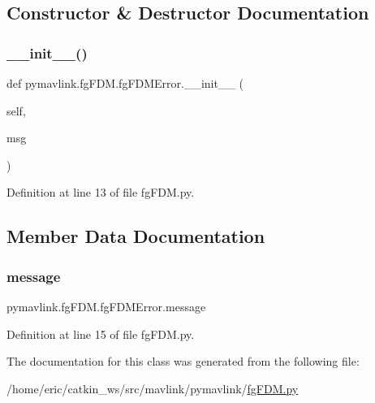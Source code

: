 \subsection{Constructor \& Destructor Documentation}
\mbox{\label{classpymavlink_1_1fgFDM_1_1fgFDMError_aa043a6d539a9fbe255bb48dc1c80fc42}} 
\subsubsection{\texorpdfstring{\_\_init\_\_()}{\_\_init\_\_()}}
{\footnotesize\ttfamily def pymavlink.\+fg\+F\+D\+M.\+fg\+F\+D\+M\+Error.\+\_\+\+\_\+init\+\_\+\+\_\+ (\begin{DoxyParamCaption}\item[{}]{self,  }\item[{}]{msg }\end{DoxyParamCaption})}



Definition at line 13 of file fg\+F\+D\+M.\+py.



\subsection{Member Data Documentation}
\mbox{\label{classpymavlink_1_1fgFDM_1_1fgFDMError_aeab57dd000a7c9c7848444bc5c3c9392}} 
\subsubsection{\texorpdfstring{message}{message}}
{\footnotesize\ttfamily pymavlink.\+fg\+F\+D\+M.\+fg\+F\+D\+M\+Error.\+message}



Definition at line 15 of file fg\+F\+D\+M.\+py.



The documentation for this class was generated from the following file\+:\begin{DoxyCompactItemize}
\item 
/home/eric/catkin\+\_\+ws/src/mavlink/pymavlink/\mbox{\hyperlink{fgFDM_8py}{fg\+F\+D\+M.\+py}}\end{DoxyCompactItemize}
